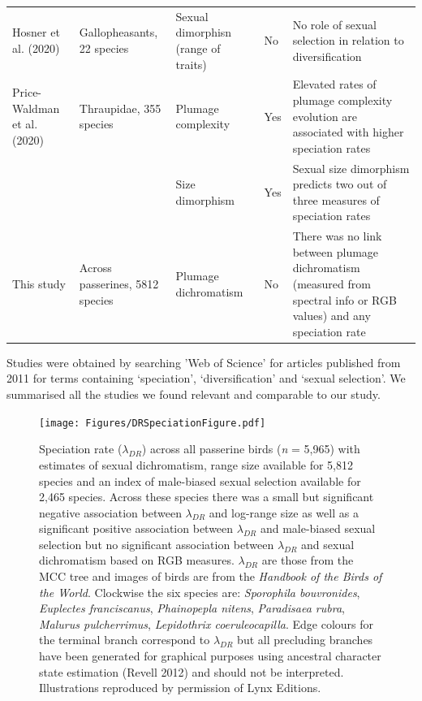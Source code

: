 \documentclass[]{article}
\begin{document}
\begin{table}[H]
{\begin{threeparttable}
\begin{tabular}{ll>{\raggedright\arraybackslash}p{10em}>{\raggedright\arraybackslash}p{3em}>{\raggedright\arraybackslash}p{27em}}
\cmidrule{1-5}
Hosner et al. (2020) & Gallopheasants, 22 species & Sexual dimorphisn (range of traits) & No & No role of sexual selection in relation to diversification\\
\cmidrule{1-5}
Price-Waldman et al. (2020) & Thraupidae, 355 species & Plumage complexity & Yes & Elevated rates of plumage complexity evolution are associated with higher speciation rates\\
\cmidrule{1-5}
 &  & Size dimorphism & Yes & Sexual size dimorphism predicts two out of three measures of speciation rates\\
\cmidrule{3-5}
\multirow{-2}{*}{\raggedright\arraybackslash This study} & \multirow{-2}{*}{\raggedright\arraybackslash Across passerines, 5812 species} & Plumage dichromatism & No & There was no link between plumage dichromatism (measured from spectral info or RGB values) and any speciation rate\\
\bottomrule
\end{tabular}
\begin{tablenotes}
\item Studies were obtained by searching 'Web of Science' for articles published from 2011 for terms containing ‘speciation’, ‘diversification’ and ‘sexual selection’. We summarised all the studies we found relevant and comparable to our study.
\end{tablenotes}
\end{threeparttable}}
\end{table}

\newpage

\renewcommand{\includegraphics}[2][]{}

\begin{figure}
\centering
\texttt{[image: Figures/DRSpeciationFigure.pdf]}
\caption{Speciation rate (\(\lambda_{DR}\)) across all passerine birds
(\emph{n} = 5,965) with estimates of sexual dichromatism, range size
available for 5,812 species and an index of male-biased sexual selection
available for 2,465 species. Across these species there was a small but
significant negative association between \(\lambda_{DR}\) and log-range
size as well as a significant positive association between
\(\lambda_{DR}\) and male-biased sexual selection but no significant
association between \(\lambda_{DR}\) and sexual dichromatism based on
RGB measures. \(\lambda_{DR}\) are those from the MCC tree and images of
birds are from the \emph{Handbook of the Birds of the World}. Clockwise
the six species are: \emph{Sporophila bouvronides}, \emph{Euplectes
franciscanus}, \emph{Phainopepla nitens}, \emph{Paradisaea rubra},
\emph{Malurus pulcherrimus}, \emph{Lepidothrix coeruleocapilla}. Edge
colours for the terminal branch correspond to \(\lambda_{DR}\) but all
precluding branches have been generated for graphical purposes using
ancestral character state estimation (Revell 2012) and should not be
interpreted. Illustrations reproduced by permission of Lynx Editions.
\label{Speciation_Figure}}
\end{figure}
\end{document}
